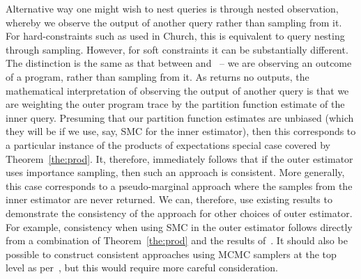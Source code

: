Alternative way one might wish to nest queries is through nested observation, whereby we
observe the output of another query rather than sampling from it.  For hard-constraints such
as used in Church, this is equivalent to query nesting through sampling.  However, for soft
constraints it can be substantially different.  The distinction is the same as that between
\sample and \observe~-- we are observing an outcome of a program, rather than sampling
from it.  As \observe returns no outputs, the mathematical interpretation of observing 
the output of another query is that we are weighting the outer program trace by the
partition function estimate of the inner query.  Presuming that our partition function estimates
are unbiased (which they will be if we use, say, SMC for the inner estimator), then
this corresponds to a particular instance of the products of expectations special case
covered by Theorem~\ref{the:prod}.  It, therefore, immediately follows that if
the outer estimator uses importance sampling, then such an approach is consistent.  More
generally, this case corresponds to a pseudo-marginal approach where the samples
from the inner estimator are never returned.  We can, therefore, use existing results
to demonstrate the consistency of the approach for other choices of outer estimator.
For example, consistency when using SMC in the outer estimator follows directly
from a combination of Theorem~\ref{the:prod} and the results of~\cite{naessethLS2015nested}.
It should also be possible to construct consistent approaches using MCMC samplers
at the top level as per~\cite{andrieu2009pseudo}, but this would require more
careful consideration.

